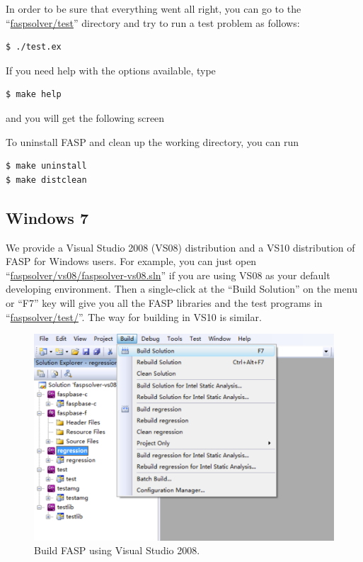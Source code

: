 \documentclass[11pt]{memoir}
\begin{document}
In order to be sure that everything went all right, you can go to the
``\url{faspsolver/test}'' directory and try to run a test problem as follows:
%
\begin{lstlisting}[numbers=none]
$ ./test.ex
\end{lstlisting}
%
If you need help with the options available, type 
%
\begin{lstlisting}[numbers=none]
$ make help
\end{lstlisting}
%
and you will get the following screen


To uninstall FASP and clean up the working directory, you can run
%
\begin{lstlisting}[numbers=none]
$ make uninstall
$ make distclean
\end{lstlisting}
%

\subsection{Windows 7}

We provide a Visual Studio 2008 (VS08) distribution and a VS10
distribution of FASP for Windows users. For example, you can just open
``\url{faspsolver/vs08/faspsolver-vs08.sln}'' if you are using VS08 as
your default developing environment. Then a single-click at the
``Build Solution'' on the menu or ``F7'' key will give you all the
FASP libraries and the test programs in
``\url{faspsolver/test/}''. The way for building in VS10 is similar.
\begin{figure}[htbp] %
   \centering
   \includegraphics[width=\linewidth]{fig/build-fasp-win7.pdf} 
   \caption{Build FASP using Visual Studio 2008.}
   \label{fig:build}
\end{figure}
\end{document}
